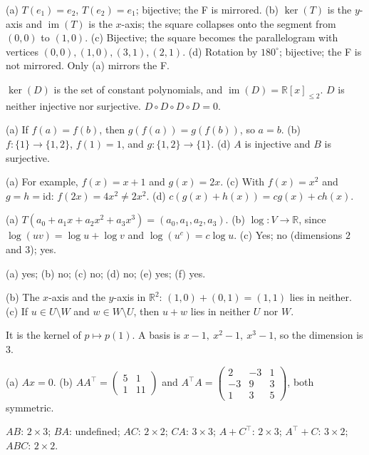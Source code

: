\documentclass[11pt]{article}
\theoremstyle{definition}
\DeclareMathOperator{\im}{im}
\begin{document}
\begin{description}[leftmargin=0pt, itemsep=0.3em]
    \item[\ref{pr:gallery}.] (a) $T(e_1) = e_2$, $T(e_2) = e_1$; bijective; the F is mirrored. (b) $\ker(T)$ is the $y$-axis and $\im(T)$ is the $x$-axis; the square collapses onto the segment from $(0, 0)$ to $(1, 0)$. (c) Bijective; the square becomes the parallelogram with vertices $(0, 0), (1, 0), (3, 1), (2, 1)$. (d) Rotation by $180^\circ$; bijective; the F is not mirrored. Only (a) mirrors the F.
    \item[\ref{pr:derivative}.] $\ker(D)$ is the set of constant polynomials, and $\im(D) = \mathbb{R}[x]_{\leq 2}$. $D$ is neither injective nor surjective. $D \circ D \circ D \circ D = 0$.
    \item[\ref{pr:composition}.] (a) If $f(a) = f(b)$, then $g(f(a)) = g(f(b))$, so $a = b$. (b) $f: \{1\} \to \{1, 2\}$, $f(1) = 1$, and $g: \{1, 2\} \to \{1\}$. (d) $A$ is injective and $B$ is surjective.
    \item[\ref{pr:distributive}.] (a) For example, $f(x) = x + 1$ and $g(x) = 2x$. (c) With $f(x) = x^2$ and $g = h = \mathrm{id}$: $f(2x) = 4x^2 \neq 2x^2$. (d) $c(g(x) + h(x)) = cg(x) + ch(x)$.
    \item[\ref{pr:iso}.] (a) $T(a_0 + a_1 x + a_2 x^2 + a_3 x^3) = (a_0, a_1, a_2, a_3)$. (b) $\log: V \to \mathbb{R}$, since $\log(uv) = \log u + \log v$ and $\log(u^c) = c\log u$. (c) Yes; no (dimensions $2$ and $3$); yes.
    \item[\ref{pr:subspaces}.] (a) yes; (b) no; (c) no; (d) no; (e) yes; (f) yes.
    \item[\ref{pr:intersection}.] (b) The $x$-axis and the $y$-axis in $\mathbb{R}^2$: $(1, 0) + (0, 1) = (1, 1)$ lies in neither. (c) If $u \in U \setminus W$ and $w \in W \setminus U$, then $u + w$ lies in neither $U$ nor $W$.
    \item[\ref{pr:poly-subspace}.] It is the kernel of $p \mapsto p(1)$. A basis is $x - 1, \ x^2 - 1, \ x^3 - 1$, so the dimension is $3$.
    \item[\ref{pr:matvec}.] (a) $Ax = 0$. (b) $AA^\top = \begin{pmatrix} 5 & 1 \\ 1 & 11 \end{pmatrix}$ and $A^\top A = \begin{pmatrix} 2 & -3 & 1 \\ -3 & 9 & 3 \\ 1 & 3 & 5 \end{pmatrix}$, both symmetric.
    \item[\ref{pr:sizes}.] $AB$: $2 \times 3$; $BA$: undefined; $AC$: $2 \times 2$; $CA$: $3 \times 3$; $A + C^\top$: $2 \times 3$; $A^\top + C$: $3 \times 2$; $ABC$: $2 \times 2$.

\end{description}
\end{document}
